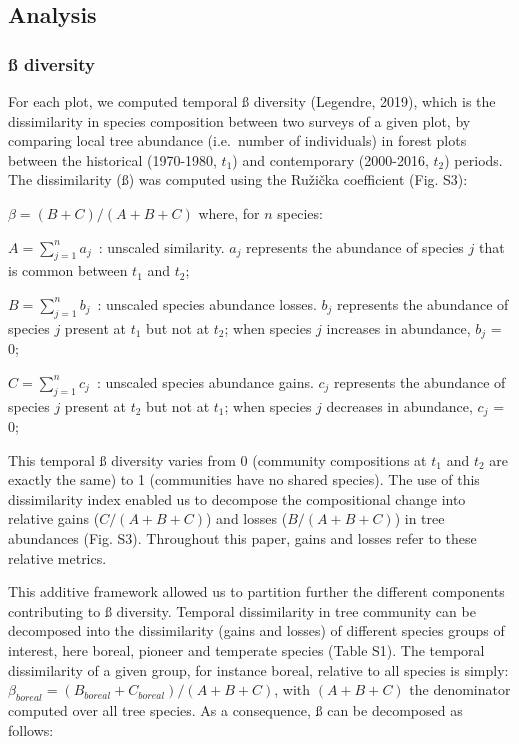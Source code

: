 \documentclass[
  a4paperpaper,
]{article}
\begin{document}
\hypertarget{analysis}{%
\subsection{Analysis}\label{analysis}}

\hypertarget{uxdf-diversity}{%
\subsubsection{ß diversity}\label{uxdf-diversity}}

For each plot, we computed temporal ß diversity (Legendre, 2019), which
is the dissimilarity in species composition between two surveys of a
given plot, by comparing local tree abundance (i.e.~number of
individuals) in forest plots between the historical (1970-1980, \(t_1\))
and contemporary (2000-2016, \(t_2\)) periods. The dissimilarity (ß) was
computed using the Ružička coefficient (Fig. S3):

\(\beta = (B+C)/(A+B+C)\) where, for \(n\) species:

\(A = \sum_{j=1}^n a_j\)~: unscaled similarity. \(a_j\) represents the
abundance of species \(j\) that is common between \(t_1\) and \(t_2\);~

\(B = \sum_{j=1}^n b_j\)~: unscaled species abundance losses. \(b_j\)
represents the abundance of species \(j\) present at \(t_1\) but not at
\(t_2\); when species \(j\) increases in abundance, \(b_j\) = 0;

\(C = \sum_{j=1}^n c_j\)~: unscaled species abundance gains. \(c_j\)
represents the abundance of species \(j\) present at \(t_2\) but not at
\(t_1\); when species \(j\) decreases in abundance, \(c_j\) = 0;

This temporal ß diversity varies from 0 (community compositions at
\(t_1\) and \(t_2\) are exactly the same) to 1 (communities have no
shared species). The use of this dissimilarity index enabled us to
decompose the compositional change into relative gains (\(C/(A+B+C)\))
and losses (\(B/(A+B+C)\)) in tree abundances (Fig. S3). Throughout this
paper, gains and losses refer to these relative metrics.

This additive framework allowed us to partition further the different
components contributing to ß diversity. Temporal dissimilarity in tree
community can be decomposed into the dissimilarity (gains and losses) of
different species groups of interest, here boreal, pioneer and temperate
species (Table S1). The temporal dissimilarity of a given group, for
instance boreal, relative to all species is simply:
\(\beta_{boreal} = (B_{boreal}+C_{boreal})/(A+B+C)\), with \((A+B+C)\)
the denominator computed over all tree species. As a consequence, ß can
be decomposed as follows:
\end{document}
